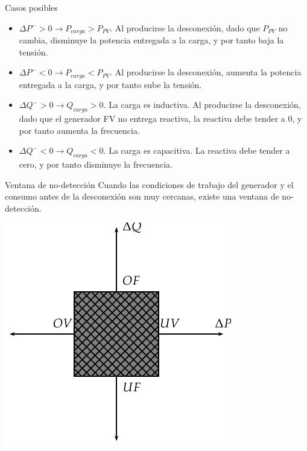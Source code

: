 \documentclass[xcolor={usenames,svgnames,dvipsnames}]{beamer}
\begin{document}
\begin{frame}[label=sec-2-6-3]{Casos posibles}
\begin{itemize}
\item $\Delta P^{-}>0\rightarrow P_{carga}>P_{PV}$. Al producirse la
desconexión, dado que $P_{PV}$ no cambia, disminuye la potencia
entregada a la carga, y por tanto baja la tensión.

\item $\Delta P^{-}<0\rightarrow P_{carga}<P_{PV}$. Al producirse la
desconexión, aumenta la potencia entregada a la carga, y por tanto
sube la tensión.

\item $\Delta Q^{-}>0\rightarrow Q_{carga}>0$. La carga es inductiva. Al
producirse la desconexión, dado que el generador FV no entrega
reactiva, la reactiva debe tender a 0, y por tanto aumenta la
frecuencia.

\item $\Delta Q^{-}<0\rightarrow Q_{carga}<0$. La carga es capacitiva. La
reactiva debe tender a cero, y por tanto disminuye la frecuencia.
\end{itemize}
\end{frame}

\begin{frame}[label=sec-2-6-4]{Ventana de no-detección}
Cuando las condiciones de trabajo del generador y el consumo antes de la
desconexión son muy cercanas, existe una ventana de no-detección.

\begin{center}
\includegraphics[height=0.6\textheight]{../figs/NDZ.pdf}
\end{center}
\end{frame}
\end{document}
